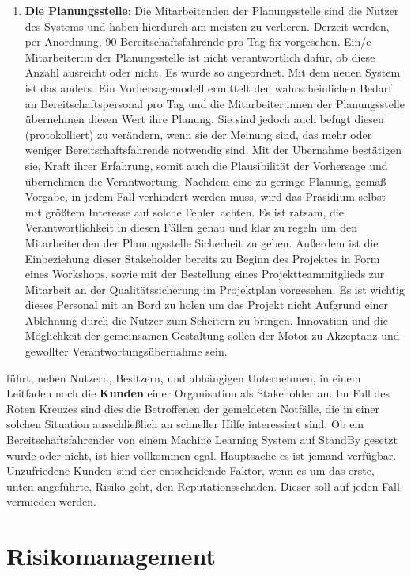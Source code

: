 \begin{enumerate}
	\item \textbf{Die Planungsstelle}: Die Mitarbeitenden der Planungsstelle sind die Nutzer des Systems und haben hierdurch am meisten zu verlieren. Derzeit werden, per Anordnung, 90 Bereitschaftsfahrende pro Tag fix vorgesehen. Ein/e Mitarbeiter:in der Planungsstelle ist nicht verantwortlich dafür, ob diese Anzahl ausreicht oder nicht. Es wurde so angeordnet. Mit dem neuen System ist das anders. Ein Vorhersagemodell ermittelt den wahrscheinlichen Bedarf an Bereitschaftspersonal pro Tag und die Mitarbeiter:innen der Planungsstelle übernehmen diesen Wert ihre Planung. Sie sind jedoch auch befugt diesen (protokolliert) zu verändern, wenn sie der Meinung sind, das mehr oder weniger Bereitschaftsfahrende notwendig sind. Mit der Übernahme bestätigen sie, Kraft ihrer Erfahrung, somit auch die Plausibilität der Vorhersage und übernehmen die Verantwortung. Nachdem eine zu geringe Planung, gemäß Vorgabe, in jedem Fall verhindert werden muss, wird das Präsidium selbst mit größtem Interesse auf solche \glqq Fehler\grqq\ achten. Es ist ratsam, die Verantwortlichkeit in diesen Fällen genau und klar zu regeln um den Mitarbeitenden der Planungsstelle Sicherheit zu geben. Außerdem ist die Einbeziehung dieser Stakeholder bereits zu Beginn des Projektes in Form eines Workshops, sowie mit der Bestellung eines Projektteammitglieds zur Mitarbeit an der Qualitätssicherung im Projektplan vorgesehen. Es ist wichtig dieses Personal mit an Bord zu holen um das Projekt nicht Aufgrund einer Ablehnung durch die Nutzer zum Scheitern zu bringen. Innovation und die Möglichkeit der gemeinsamen Gestaltung sollen der Motor zu Akzeptanz und gewollter Verantwortungsübernahme sein.
\end{enumerate}

\cite{microtool_gmbh_stakeholder_2017} führt, neben Nutzern, Besitzern, und abhängigen Unternehmen, in einem Leitfaden noch die \textbf{Kunden} einer Organisation als Stakeholder an. Im Fall des Roten Kreuzes sind dies die Betroffenen der gemeldeten Notfälle, die in einer solchen Situation ausschließlich an schneller Hilfe interessiert sind. Ob ein Bereitschaftsfahrender von einem Machine Learning System auf StandBy gesetzt wurde oder nicht, ist hier vollkommen egal. Hauptsache es ist jemand verfügbar. Unzufriedene \glqq Kunden\grqq\ sind der entscheidende Faktor, wenn es um das erste, unten angeführte, Risiko geht, den Reputationsschaden. Dieser soll auf jeden Fall vermieden werden.

\chapter{Risikomanagement}

